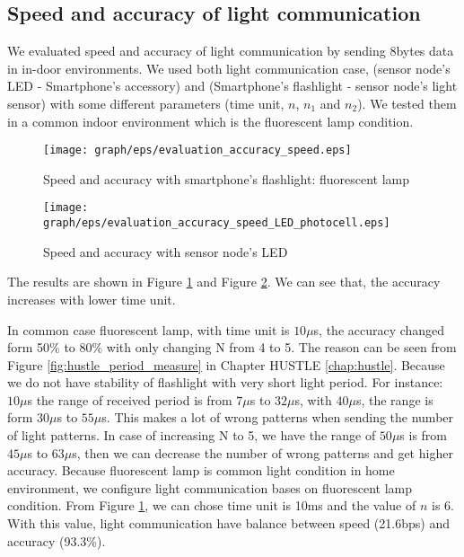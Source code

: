 \subsection{Speed and accuracy of light communication}

We evaluated speed and accuracy of light communication by sending 8bytes data in in-door environments. We used both light communication case, (sensor node's LED - Smartphone's accessory) and (Smartphone's flashlight - sensor node's light sensor) with some different parameters (time unit, $n$, $n_1$ and $n_2$). We tested them in a common indoor environment which is the fluorescent lamp condition.

\begin{figure}[htbp]
\centering
\texttt{[image: graph/eps/evaluation\_accuracy\_speed.eps]}
\caption{Speed and accuracy with smartphone's flashlight: fluorescent lamp}
\label{fig:evaluation_speed_accuracy1_flu}
\end{figure}

\begin{figure}[htbp]
\centering
\texttt{[image: graph/eps/evaluation\_accuracy\_speed\_LED\_photocell.eps]}
\caption{Speed and accuracy with sensor node's LED}
\label{fig:evaluation_speed_accuracy2}
\end{figure}

The results are shown in Figure \ref{fig:evaluation_speed_accuracy1_flu} and Figure \ref{fig:evaluation_speed_accuracy2}. We can see that, the accuracy increases with lower time unit. 

In common case fluorescent lamp, with time unit is $10\mu$s, the accuracy changed form 50\% to 80\% with only changing N from 4 to 5. The reason can be seen from Figure \ref{fig:hustle_period_measure} in Chapter HUSTLE \ref{chap:hustle}. Because we do not have stability of flashlight with very short light period. For instance: $10\mu$s the range of received period is from $7\mu$s to $32\mu$s, with $40\mu$s, the range is form $30\mu$s to $55\mu$s. This makes a lot of wrong patterns when sending the number of light patterns. In case   of increasing N to 5, we have the range of $50\mu$s is from $45\mu$s to $63\mu$s, then we can decrease the number of wrong patterns and get higher accuracy. Because fluorescent lamp is common light condition in home environment, we configure light communication bases on fluorescent lamp condition. From Figure \ref{fig:evaluation_speed_accuracy1_flu}, we can chose time unit is 10ms and the value of $n$ is 6. With this value, light communication have balance between speed (21.6bps) and accuracy (93.3\%).

